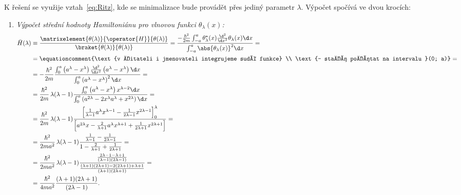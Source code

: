 \begin{solution}
	K řešení se využije vztah~\eqref{eq:Ritz}, kde se minimalizace bude provádět přes jediný parametr $\lambda$.
	Výpočet spočívá ve dvou krocích:
	\begin{enumerate}
	\item
		\emph{Výpočet střední hodnoty Hamiltoniánu pro vlnovou funkci $\theta_{\lambda}(x)$:}
		\begin{align}
			\bar{H}(\lambda)
				&\equiv\frac{\matrixelement{\theta(\lambda)}{\operator{H}}{\theta(\lambda)}}{\braket{\theta(\lambda)}{\theta(\lambda)}}
					=\frac{-\frac{\hbar^{2}}{2m}\int_{-a}^{a}\theta^{*}_{\lambda}(x)\frac{\d^{2}}{\d x^{2}}\theta_{\lambda}(x)\d x}
					{\int_{-a}^{a}\abs{\theta_{\lambda}(x)}^{2}\d x}=\nonumber\\
				&=\equationcomment{\text{v čitateli i jmenovateli integrujeme sudé funkce} \\ \text{-- stačí počítat na intervalu }(0; a)}=\nonumber\\
				&=-\frac{\hbar^{2}}{2m}\frac{\int_{0}^{a}\left(a^{\lambda}-x^{\lambda}\right)
					\frac{\d^{2}}{\d x^{2}}\left(a^{\lambda}-x^{\lambda}\right)\d x}
					{\int_{0}^{a}\left(a^{\lambda}-x^{\lambda}\right)^{2}\d x}=\nonumber\\
				&=\frac{\hbar^{2}}{2m}\,\lambda(\lambda-1)
					\frac{\int_{0}^{a}\left(a^{\lambda}-x^{\lambda}\right)x^{\lambda-2}\d x}
					{\int_{0}^{a}\left(a^{2\lambda}-2x^{\lambda}a^{\lambda}+x^{2\lambda}\right)\d x}=\nonumber\\
				&=\frac{\hbar^{2}}{2m}\,\lambda(\lambda-1)
					\frac{\left[\frac{1}{\lambda-1}a^{\lambda}x^{\lambda-1}-\frac{1}{2\lambda-1}x^{2\lambda-1}\right]_{0}^{\lambda}}
					{\left[a^{2\lambda}x-\frac{2}{\lambda+1}a^{\lambda}x^{\lambda+1}+\frac{1}{2\lambda+1}x^{2\lambda+1}\right]}=\nonumber\\
				&=\frac{\hbar^{2}}{2ma^{2}}\,\lambda(\lambda-1)
					\frac{\frac{1}{\lambda-1}-\frac{1}{2\lambda-1}}{1-\frac{2}{\lambda+1}+\frac{1}{2\lambda+1}}=\nonumber\\
				&=\frac{\hbar^{2}}{2ma^{2}}\,\lambda(\lambda-1)
					\frac{\frac{2\lambda-1-\lambda+1}{(\lambda-1)(2\lambda-1)}}
					{\frac{(\lambda+1)(2\lambda+1)-2(2\lambda+1)+\lambda+1}{(\lambda+1)(2\lambda+1)}}=\nonumber\\
				&=\frac{\hbar^{2}}{4ma^{2}}
					\frac{(\lambda+1)(2\lambda+1)}{(2\lambda-1)}.
		\end{align}


\end{enumerate}
\end{solution}
